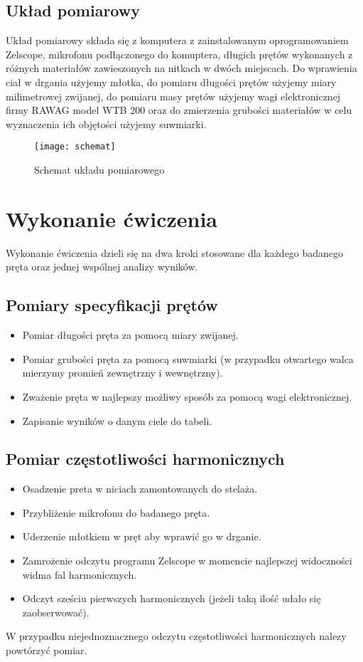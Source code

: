 \documentclass[a4paper,12pts]{article}
\begin{document}
\subsection{Układ pomiarowy}
Układ pomiarowy składa się z komputera z zainstalowanym oprogramowaniem Zelscope, mikrofonu podłączonego do komuptera, długich prętów wykonanych z różnych materiałów zawieszonych na nitkach w dwóch miejscach. Do wprawienia ciał w drgania użyjemy młotka, do pomiaru długości prętów użyjemy miary milimetrowej zwijanej, do pomiaru masy prętów użyjemy wagi elektronicznej firmy RAWAG model WTB 200 oraz do zmierzenia grubości materiałów w celu wyznaczenia ich objętości użyjemy suwmiarki.

\begin{figure}[!h]
	\centering
	\texttt{[image: schemat]}
	\caption{Schemat układu pomiarowego}
	\label{schematUkladu}
\end{figure}


\newpage \section{Wykonanie ćwiczenia}
Wykonanie ćwiczenia dzieli się na dwa kroki stosowane dla każdego badanego pręta oraz jednej wspólnej analizy wyników.
\subsection{Pomiary specyfikacji prętów}
\begin{itemize}
	\item Pomiar długości pręta za pomocą miary zwijanej.
	\item Pomiar grubości pręta za pomocą suwmiarki (w przypadku otwartego walca mierzymy promień zewnętrzny i wewnętrzny).
	\item Zważenie pręta w najlepszy możliwy sposób za pomocą wagi elektronicznej.
	\item Zapisanie wyników o danym ciele do tabeli.
\end{itemize}

\subsection{Pomiar częstotliwości harmonicznych}
\begin{itemize}
	\item Osadzenie preta w niciach zamontowanych do stelaża.
	\item Przybliżenie mikrofonu do badanego pręta.
	\item Uderzenie młotkiem w pręt aby wprawić go w drganie.
	\item Zamrożenie odczytu programu Zelscope w momencie najlepszej widoczności widma fal harmonicznych.
	\item Odczyt sześciu pierwszych harmonicznych (jeżeli taką ilość udało się zaobserwować).
\end{itemize}
W przypadku niejednoznacznego odczytu częstotliwości harmonicznych nalezy powtórzyć pomiar.
\end{document}
